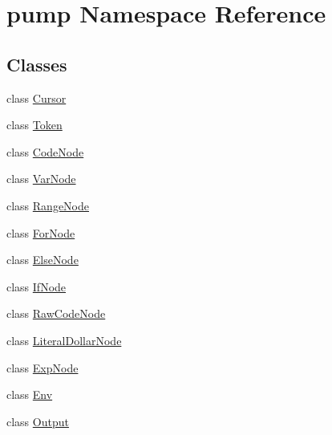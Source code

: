 \hypertarget{namespacepump}{\section{pump \-Namespace \-Reference}
\label{df/d92/namespacepump}
}
\subsection*{\-Classes}
\begin{DoxyCompactItemize}
\item 
class \hyperlink{classpump_1_1Cursor}{\-Cursor}
\item 
class \hyperlink{classpump_1_1Token}{\-Token}
\item 
class \hyperlink{classpump_1_1CodeNode}{\-Code\-Node}
\item 
class \hyperlink{classpump_1_1VarNode}{\-Var\-Node}
\item 
class \hyperlink{classpump_1_1RangeNode}{\-Range\-Node}
\item 
class \hyperlink{classpump_1_1ForNode}{\-For\-Node}
\item 
class \hyperlink{classpump_1_1ElseNode}{\-Else\-Node}
\item 
class \hyperlink{classpump_1_1IfNode}{\-If\-Node}
\item 
class \hyperlink{classpump_1_1RawCodeNode}{\-Raw\-Code\-Node}
\item 
class \hyperlink{classpump_1_1LiteralDollarNode}{\-Literal\-Dollar\-Node}
\item 
class \hyperlink{classpump_1_1ExpNode}{\-Exp\-Node}
\item 
class \hyperlink{classpump_1_1Env}{\-Env}
\item 
class \hyperlink{classpump_1_1Output}{\-Output}
\end{DoxyCompactItemize}
